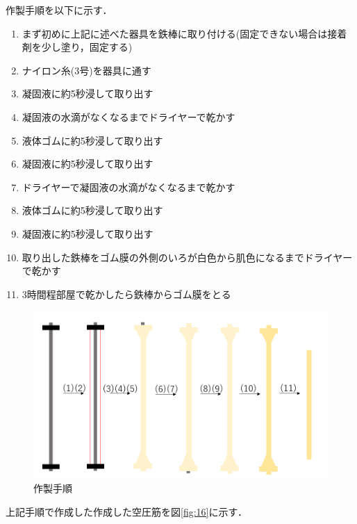 作製手順を以下に示す．
\begin{enumerate}
  \item まず初めに上記に述べた器具を鉄棒に取り付ける(固定できない場合は接着剤を少し塗り，固定する)
  \item ナイロン糸(3号)を器具に通す
  \item 凝固液に約5秒浸して取り出す
  \item 凝固液の水滴がなくなるまでドライヤーで乾かす
  \item 液体ゴムに約5秒浸して取り出す
  \item 凝固液に約5秒浸して取り出す
  \item ドライヤーで凝固液の水滴がなくなるまで乾かす
  \item 液体ゴムに約5秒浸して取り出す
  \item 凝固液に約5秒浸して取り出す
  \item 取り出した鉄棒をゴム膜の外側のいろが白色から肌色になるまでドライヤーで乾かす
  \item 3時間程部屋で乾かしたら鉄棒からゴム膜をとる
\end{enumerate}
\begin{figure}[h]
  \centering  %
  \includegraphics[scale=0.35]{pic/14.PNG}
  \caption{作製手順}
  \label{fig:15}
\end{figure}
上記手順で作成した作成した空圧筋を図\ref{fig:16}に示す．
